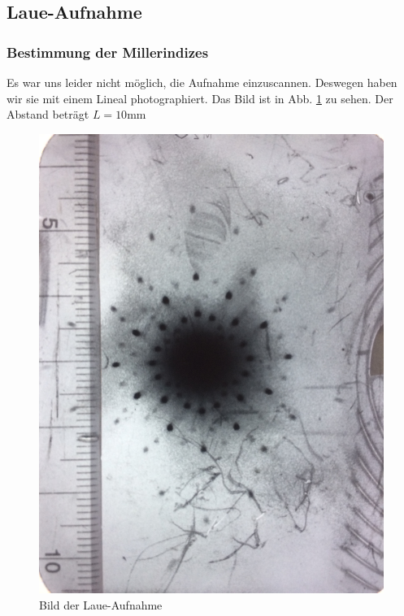 \subsection{Laue-Aufnahme}
\subsubsection{Bestimmung der Millerindizes}
Es war uns leider nicht möglich, die Aufnahme einzuscannen. Deswegen haben wir sie mit einem Lineal photographiert. Das Bild ist in Abb. \ref{fig:laue_raw} zu sehen. Der Abstand beträgt $L = 10\si{\milli\meter}$\\

\begin{figure}
\centering
\includegraphics[scale=0.1]{data/laue/laue.jpeg}
\caption{Bild der Laue-Aufnahme}
\label{fig:laue_raw}
\end{figure}


